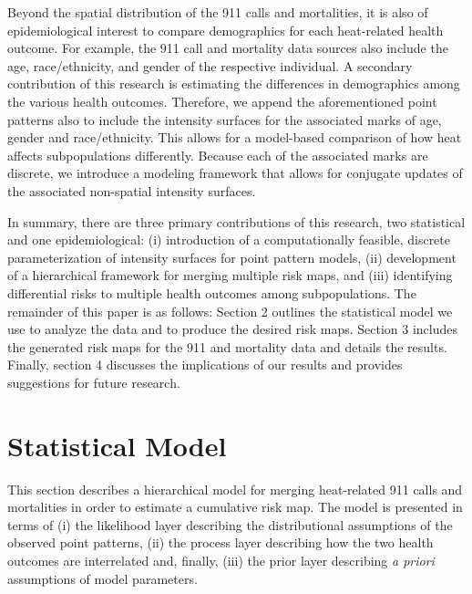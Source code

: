 \documentclass[final]{statsoc}
\begin{document}
Beyond the spatial distribution of the 911 calls and mortalities, it is
also of epidemiological interest to compare demographics for each heat-related
health outcome. For example, the 911 call and mortality data sources also include
the age, race/ethnicity, and gender of the respective individual. A secondary
contribution of this research is estimating the differences in demographics
among the various health outcomes. Therefore, we append the aforementioned 
point patterns also to include the intensity surfaces for the associated
marks of age, gender and race/ethnicity. This allows for a model-based comparison of 
how heat affects subpopulations differently. Because each of the associated 
marks are discrete, we introduce a modeling framework that allows for conjugate 
updates of the associated non-spatial intensity surfaces.

In summary, there are three primary contributions of this research, two statistical and one epidemiological: (i) introduction of a computationally feasible, discrete parameterization of intensity surfaces for point pattern models, (ii) development of a hierarchical framework for merging multiple risk maps, and (iii) identifying differential risks to multiple health outcomes among subpopulations. The remainder of this paper is as follows: Section 2 outlines the statistical model we use to analyze the data and to produce the desired risk maps.
Section 3 includes the generated risk maps for the 911 and mortality data
and details the results. Finally, section 4 discusses the implications
of our results and provides suggestions for future research.

\section{Statistical Model}\label{model}
This section describes a hierarchical model for merging heat-related 911 calls 
and mortalities in order to estimate a cumulative risk map. The model is presented 
in terms of (i) the likelihood layer describing the distributional assumptions 
of the observed point patterns, (ii) the process layer describing how the two health 
outcomes are interrelated and, finally, (iii) the prior layer describing 
\textit{a priori} assumptions of model parameters.
\end{document}
